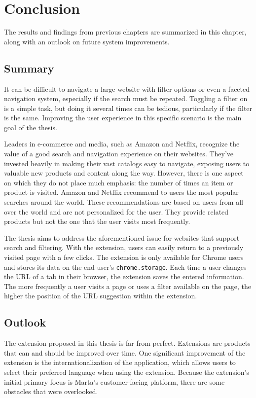 \newpage
\chapter{Conclusion}
The results and findings from previous chapters are summarized in this chapter, along with an outlook on future system improvements.

\section{Summary}
It can be difficult to navigate a large website with filter options or even a faceted navigation system, especially if the search must be repeated. Toggling a filter on is a simple task, but doing it several times can be tedious, particularly if the filter is the same. Improving the user experience in this specific scenario is the main goal of the thesis.

Leaders in e-commerce and media, such as Amazon and Netflix, recognize the value of a good search and navigation experience on their websites. They've invested heavily in making their vast catalogs easy to navigate, exposing users to valuable new products and content along the way. However, there is one aspect on which they do not place much emphasis: the number of times an item or product is visited. Amazon and Netflix recommend to users the most popular searches around the world. These recommendations are based on users from all over the world and are not personalized for the user. They provide related products but not the one that the user visits most frequently.

The thesis aims to address the aforementioned issue for websites that support search and filtering. With the extension, users can easily return to a previously visited page with a few clicks. The extension is only available for Chrome users and stores its data on the end user's \texttt{chrome.storage}. Each time a user changes the URL of a tab in their browser, the extension saves the entered information. The more frequently a user visits a page or uses a filter available on the page, the higher the position of the URL suggestion within the extension.

\section{Outlook}
The extension proposed in this thesis is far from perfect. Extensions are products that can and should be improved over time. One significant improvement of the extension is the internationalization of the application, which allows users to select their preferred language when using the extension. Because the extension's initial primary focus is Marta's customer-facing platform, there are some obstacles that were overlooked.

